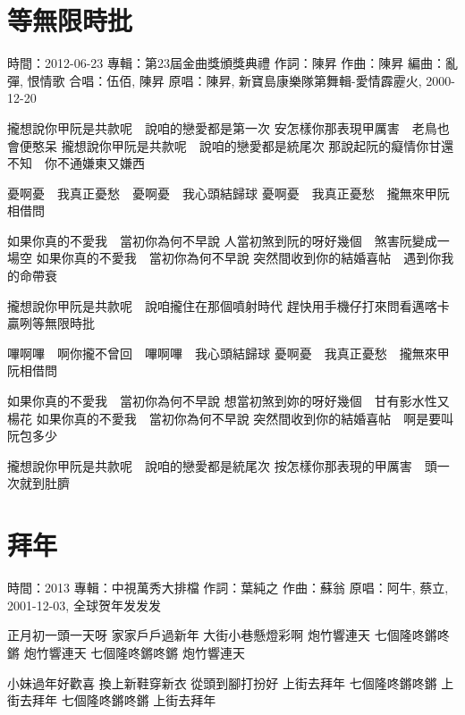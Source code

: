 \documentclass[UTF8,a4paper,oneside,twocolumn,12pt]{ctexbook}
\newcommand{\infopair}[2]{\textbullet #1：#2}
\newcommand{\zc}[1][伍佰]{\infopair{作詞}{#1}}
\newcommand{\zq}[1][伍佰]{\infopair{作曲}{#1}}
\newcommand{\bq}[1][伍佰]{\infopair{編曲}{#1}}
\newcommand{\zj}[1]{\infopair{專輯}{#1}}
\newcommand{\yc}[1]{\infopair{原唱}{#1}}
\newcommand{\sj}[1]{\infopair{時間}{#1}}
\newenvironment{info}{\begin{flushleft}\kaishu
	}
	{\end{flushleft}\normalsize\yahei\par}
\newenvironment{lyric}{
	}
{}
\begin{document}
\section{等無限時批}
\begin{info}
	\sj{2012-06-23}
	\zj{第23屆金曲獎頒獎典禮}
	\zc[陳昇]
	\zq[陳昇]
	\bq[亂彈, 恨情歌]
	\infopair{合唱}{伍佰, 陳昇}
	\yc{陳昇, 新寶島康樂隊第舞輯-愛情霹靂火, 2000-12-20}
\end{info}
\begin{lyric}
	攏想說你甲阮是共款呢　說咱的戀愛都是第一次
	安怎樣你那表現甲厲害　老鳥也會便憨呆
	攏想說你甲阮是共款呢　說咱的戀愛都是統尾次
	那說起阮的癡情你甘還不知　你不通嫌東又嫌西

	憂啊憂　我真正憂愁　憂啊憂　我心頭結歸球
	憂啊憂　我真正憂愁　攏無來甲阮相借問

	如果你真的不愛我　當初你為何不早說
	人當初煞到阮的呀好幾個　煞害阮變成一場空
	如果你真的不愛我　當初你為何不早說
	突然間收到你的結婚喜帖　遇到你我的命帶衰

	攏想說你甲阮是共款呢　說咱攏住在那個噴射時代
	趕快用手機仔打來問看邁喀卡贏咧等無限時批

	嗶啊嗶　啊你攏不曾回　嗶啊嗶　我心頭結歸球
	憂啊憂　我真正憂愁　攏無來甲阮相借問

	如果你真的不愛我　當初你為何不早說
	想當初煞到妳的呀好幾個　甘有影水性又楊花
	如果你真的不愛我　當初你為何不早說
	突然間收到你的結婚喜帖　啊是要叫阮包多少

	攏想說你甲阮是共款呢　說咱的戀愛都是統尾次
	按怎樣你那表現的甲厲害　頭一次就到肚臍
\end{lyric}

\section{拜年}%
\begin{info}
	\sj{2013}
	\zj{中視萬秀大排檔}
	\zc[葉純之]
	\zq[蘇翁]
	\yc{阿牛, 蔡立, 2001-12-03, 全球贺年发发发}
\end{info}
\begin{lyric}
	正月初一頭一天呀 家家戶戶過新年
	大街小巷懸燈彩啊 炮竹響連天
	七個隆咚鏘咚鏘 炮竹響連天
	七個隆咚鏘咚鏘 炮竹響連天

	小妹過年好歡喜 換上新鞋穿新衣
	從頭到腳打扮好 上街去拜年
	七個隆咚鏘咚鏘 上街去拜年
	七個隆咚鏘咚鏘 上街去拜年
\end{lyric}
\end{document}
